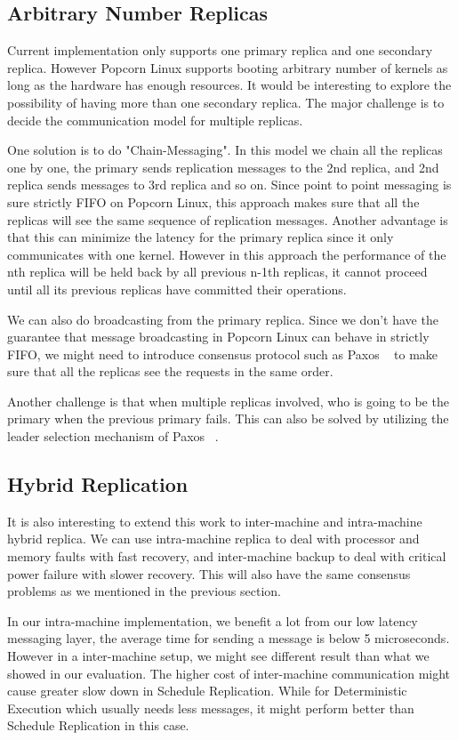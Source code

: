 \subsection{Arbitrary Number Replicas}
Current implementation only supports one primary replica and one secondary replica. However Popcorn Linux supports booting arbitrary number of kernels as long as the hardware has enough resources. It would be interesting to explore the possibility of having more than one secondary replica. The major challenge is to decide the communication model for multiple replicas.

One solution is to do "Chain-Messaging". In this model we chain all the replicas one by one, the primary sends replication messages to the 2nd replica, and 2nd replica sends messages to 3rd replica and so on. Since point to point messaging is sure strictly FIFO on Popcorn Linux, this approach makes sure that all the replicas will see the same sequence of replication messages. Another advantage is that this can minimize the latency for the primary replica since it only communicates with one kernel. However in this approach the performance of the nth replica will be held back by all previous n-1th replicas, it cannot proceed until all its previous replicas have committed their operations.

We can also do broadcasting from the primary replica. Since we don't have the guarantee that message broadcasting in Popcorn Linux can behave in strictly FIFO, we might need to introduce consensus protocol such as Paxos ~\cite{lamport2001paxos} to make sure that all the replicas see the requests in the same order.

Another challenge is that when multiple replicas involved, who is going to be the primary when the previous primary fails. This can also be solved by utilizing the leader selection mechanism of Paxos ~\cite{lamport2001paxos}.

\subsection{Hybrid Replication}

It is also interesting to extend this work to inter-machine and intra-machine hybrid replica. We can use intra-machine replica to deal with processor and memory faults with fast recovery, and inter-machine backup to deal with critical power failure with slower recovery. This will also have the same consensus problems as we mentioned in the previous section.

In our intra-machine implementation, we benefit a lot from our low latency messaging layer, the average time for sending a message is below 5 microseconds. However in a inter-machine setup, we might see different result than what we showed in our evaluation. The higher cost of inter-machine communication might cause greater slow down in Schedule Replication. While for Deterministic Execution which usually needs less messages, it might perform better than Schedule Replication in this case.